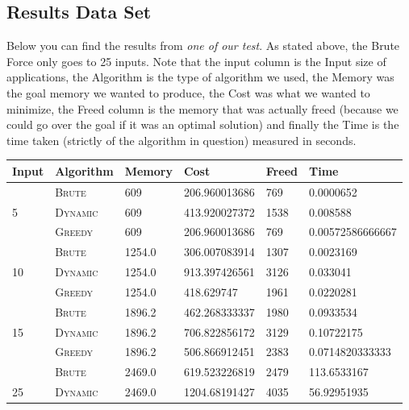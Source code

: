 \documentclass{article}
\begin{document}
\subsection{Results Data Set}
Below you can find the results from \textit{one of our test}. As stated above, the Brute Force only goes to 25 inputs. Note that the input column is the Input size of applications, the Algorithm is the type of algorithm we used, the Memory was the goal memory we wanted to produce, the Cost was what we wanted to minimize, the Freed column is the memory that was actually freed (because we could go over the goal if it was an optimal solution) and finally the Time is the time taken (strictly of the algorithm in question) measured in seconds.
\begin{adjustwidth}{-.5cm}{}
    \begin{center}
        \begin{tabular}{l|lllll} \toprule
 \textbf{Input} & \textbf{Algorithm} & \textbf{Memory} & \textbf{Cost} & \textbf{Freed} & \textbf{Time} \\ \hline
        & \textsc{Brute}   & 609       & 206.960013686    & 769      &  0.0000652            \\
5       & \textsc{Dynamic} & 609       & 413.920027372    & 1538     &  0.008588             \\
        & \textsc{Greedy}  & 609       & 206.960013686    & 769      &  0.00572586666667     \\ \midrule
        & \textsc{Brute}   & 1254.0    & 306.007083914    & 1307     &  0.0023169            \\
10      & \textsc{Dynamic} & 1254.0    & 913.397426561    & 3126     &  0.033041             \\
        & \textsc{Greedy}  & 1254.0    & 418.629747       & 1961     &  0.0220281            \\ \midrule
        & \textsc{Brute}   & 1896.2    & 462.268333337    & 1980     &  0.0933534            \\
15      & \textsc{Dynamic} & 1896.2    & 706.822856172    & 3129     &  0.10722175           \\
        & \textsc{Greedy}  & 1896.2    & 506.866912451    & 2383     &  0.0714820333333      \\ \midrule
        & \textsc{Brute}   & 2469.0    & 619.523226819    & 2479     &  113.6533167          \\
25      & \textsc{Dynamic} & 2469.0    & 1204.68191427    & 4035     &  56.92951935          \\

\end{tabular}
\end{center}
\end{adjustwidth}
\end{document}
